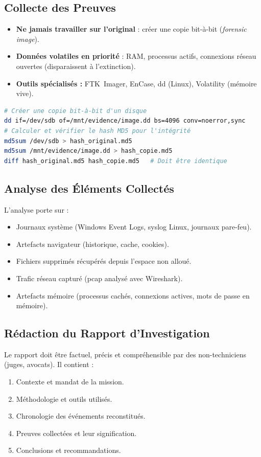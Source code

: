 \subsection{Collecte des Preuves}
\begin{itemize}
    \item \textbf{Ne jamais travailler sur l'original} : créer une copie bit-à-bit (\textit{forensic image}).
    \item \textbf{Données volatiles en priorité} : RAM, processus actifs, connexions réseau ouvertes (disparaissent à l'extinction).
    \item \textbf{Outils spécialisés :} FTK~Imager, EnCase, dd (Linux), Volatility (mémoire vive).
\end{itemize}

\begin{lstlisting}[language=bash, caption=Création d'une image forensique avec dd]
# Créer une copie bit-à-bit d'un disque
dd if=/dev/sdb of=/mnt/evidence/image.dd bs=4096 conv=noerror,sync
# Calculer et vérifier le hash MD5 pour l'intégrité
md5sum /dev/sdb > hash_original.md5
md5sum /mnt/evidence/image.dd > hash_copie.md5
diff hash_original.md5 hash_copie.md5   # Doit être identique
\end{lstlisting}

\subsection{Analyse des Éléments Collectés}
L'analyse porte sur :
\begin{itemize}
    \item Journaux système (Windows Event Logs, syslog Linux, journaux pare-feu).
    \item Artefacts navigateur (historique, cache, cookies).
    \item Fichiers supprimés récupérés depuis l'espace non alloué.
    \item Trafic réseau capturé (pcap analysé avec Wireshark).
    \item Artefacts mémoire (processus cachés, connexions actives, mots de passe en mémoire).
\end{itemize}

\subsection{Rédaction du Rapport d'Investigation}
Le rapport doit être factuel, précis et compréhensible par des non-techniciens (juges, avocats). Il contient :
\begin{enumerate}
    \item Contexte et mandat de la mission.
    \item Méthodologie et outils utilisés.
    \item Chronologie des événements reconstitués.
    \item Preuves collectées et leur signification.
    \item Conclusions et recommandations.
\end{enumerate}

